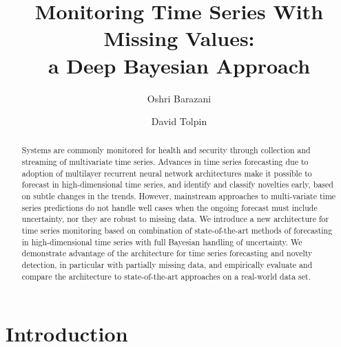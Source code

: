 \documentclass[runningheads]{llncs}
\begin{document}
\title{Monitoring Time Series With Missing Values:\\a Deep Bayesian Approach}

\author{Oshri Barazani \and David Tolpin}


\maketitle

\begin{abstract}
Systems are commonly monitored for health and security through
collection and streaming of multivariate time series. Advances
in time series forecasting due to adoption of multilayer
recurrent neural network architectures make it possible to
forecast in high-dimensional time series, and identify and
classify novelties early, based on subtle changes in the trends.
However, mainstream approaches to multi-variate time series
predictions do not handle well cases when the ongoing forecast
must include uncertainty, nor they are robust to missing data.
We introduce a new architecture for time series monitoring based
on combination of state-of-the-art methods of forecasting in
high-dimensional time series with full Bayesian handling of
uncertainty. We demonstrate advantage of the architecture for
time series forecasting and novelty detection, in particular
with partially missing data, and empirically evaluate and
compare the architecture to state-of-the-art approaches on a
real-world data set.
\end{abstract}



\section{Introduction}
\end{document}
